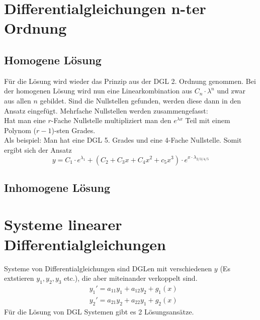 \documentclass[a4paper,10pt]{scrartcl}
\begin{document}
        \section{Differentialgleichungen n-ter Ordnung}
        \subsection*{Homogene Lösung}
        
        Für die Lösung wird wieder das Prinzip aus der DGL 2. Ordnung genommen. Bei der homogenen Lösung wird nun eine Linearkombination aus \(C_n \cdot \lambda^n \) und 
        zwar aus allen \(n\) gebildet. Sind die Nullstellen gefunden, werden diese dann in den Ansatz eingefügt. Mehrfache Nullstellen werden zusammengefasst: \\
        Hat man eine \(r\)-Fache Nullstelle multipliziert man den \(e^{\lambda x}\) Teil mit einem Polynom (\(r-1\))-sten Grades. \\
        Als beispiel: Man hat eine DGL 5. Grades und eine 4-Fache Nullstelle. Somit ergibt sich der Ansatz 
        \begin{equation}
            y = C_1 \cdot e^{\lambda_1} + (C_2 + C_3x + C_4x^2 + c_5x^3) \cdot e^{x \cdot \lambda_{2/3/4/5}}
        \end{equation}   

        \subsection*{Inhomogene Lösung}

        \section{Systeme linearer Differentialgleichungen}
        Systeme von Differentialgleichungen sind DGLen mit verschiedenen \(y\) (Es extstieren  \(y_1, y_2, y_3\) etc.), die aber miteinander verkoppelt sind.
        \begin{equation*}
            \begin{aligned}
                & y_1' = a_{11}y_1 + a_{12}y_2 + g_1(x) \\
                & y_2' = a_{21}y_2 + a_{22}y_1 + g_2(x)  
            \end{aligned}
        \end{equation*}
        Für die Lösung von DGL Systemen gibt es 2 Lösungsansätze.
\end{document}

